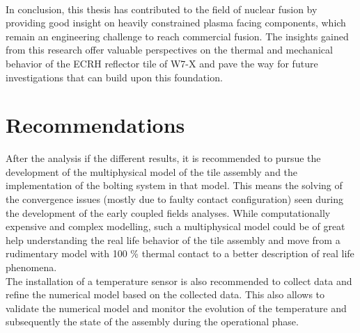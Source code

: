 \\
\break
\normalsize{\indent In conclusion, this thesis has contributed to the field of nuclear fusion by providing good insight on heavily constrained plasma facing components, which remain an engineering challenge to reach commercial fusion. The insights gained from this research offer valuable perspectives on the thermal and mechanical behavior of the \acrshort{ECRH} reflector tile of \acrshort{W7-X} and pave the way for future investigations that can build upon this foundation.}
\section{Recommendations}
\normalsize{After the analysis if the different results, it is recommended to pursue the development of the multiphysical model of the tile assembly and the implementation of the bolting system in that model. This means the solving of the convergence issues (mostly due to faulty contact configuration) seen during the development of the early coupled fields analyses. While computationally expensive and complex modelling, such a multiphysical model could be of great help understanding the real life behavior of the tile assembly and move from a rudimentary model with 100 \% thermal contact to a better description of real life phenomena.}
\\
\break
\normalsize{\indent The installation of a temperature sensor is also recommended to collect data and refine the numerical model based on the collected data. This also allows to validate the numerical model and monitor the evolution of the temperature and subsequently the state of the assembly during the operational phase.} 